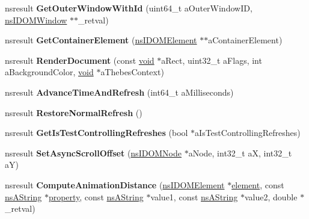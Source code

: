 \begin{DoxyCompactItemize}
\item 
\mbox{\label{interfacens_i_d_o_m_window_utils_a379725ad61545022840d1b20ec9b709f}} 
nsresult {\bfseries Get\+Outer\+Window\+With\+Id} (uint64\+\_\+t a\+Outer\+Window\+ID, \hyperlink{interfacens_i_d_o_m_window}{ns\+I\+D\+O\+M\+Window} $\ast$$\ast$\+\_\+retval)
\item 
\mbox{\label{interfacens_i_d_o_m_window_utils_af09c98edd6584dd54e343c71cc965203}} 
nsresult {\bfseries Get\+Container\+Element} (\hyperlink{interfacens_i_d_o_m_element}{ns\+I\+D\+O\+M\+Element} $\ast$$\ast$a\+Container\+Element)
\item 
\mbox{\label{interfacens_i_d_o_m_window_utils_aa204b964b5db149d2980764237b7cf6a}} 
nsresult {\bfseries Render\+Document} (const \hyperlink{interfacevoid}{void} $\ast$a\+Rect, uint32\+\_\+t a\+Flags, int a\+Background\+Color, \hyperlink{interfacevoid}{void} $\ast$a\+Thebes\+Context)
\item 
\mbox{\label{interfacens_i_d_o_m_window_utils_a0d14ec0d4ac7a45e3de22471ba27b15b}} 
nsresult {\bfseries Advance\+Time\+And\+Refresh} (int64\+\_\+t a\+Milliseconds)
\item 
\mbox{\label{interfacens_i_d_o_m_window_utils_afa02f5d6570bb5e6a9258b8806da7f0b}} 
nsresult {\bfseries Restore\+Normal\+Refresh} ()
\item 
\mbox{\label{interfacens_i_d_o_m_window_utils_a5de94ad98b04fa78a3137c0251e21c1f}} 
nsresult {\bfseries Get\+Is\+Test\+Controlling\+Refreshes} (bool $\ast$a\+Is\+Test\+Controlling\+Refreshes)
\item 
\mbox{\label{interfacens_i_d_o_m_window_utils_a63227accda4d04eb520c1a4fa8268483}} 
nsresult {\bfseries Set\+Async\+Scroll\+Offset} (\hyperlink{interfacens_i_d_o_m_node}{ns\+I\+D\+O\+M\+Node} $\ast$a\+Node, int32\+\_\+t aX, int32\+\_\+t aY)
\item 
\mbox{\label{interfacens_i_d_o_m_window_utils_ac01d4621d8c6ebc599a03b82f9f1e36c}} 
nsresult {\bfseries Compute\+Animation\+Distance} (\hyperlink{interfacens_i_d_o_m_element}{ns\+I\+D\+O\+M\+Element} $\ast$\hyperlink{structelement}{element}, const \hyperlink{structns_string_container}{ns\+A\+String} $\ast$\hyperlink{structproperty}{property}, const \hyperlink{structns_string_container}{ns\+A\+String} $\ast$value1, const \hyperlink{structns_string_container}{ns\+A\+String} $\ast$value2, double $\ast$\+\_\+retval)

\end{DoxyCompactItemize}
